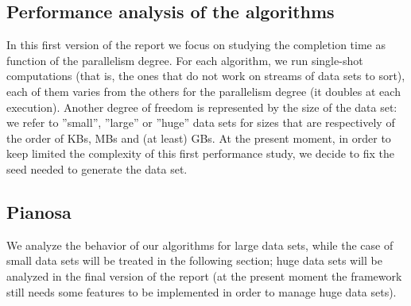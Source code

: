 \subsection{Performance analysis of the algorithms}
In this first version of the report we focus on studying the completion time as function of the parallelism degree. For each algorithm, we run single-shot computations (that is, the ones that do not work on streams of data sets to sort), each of them varies from the others for the parallelism degree (it doubles at each execution). Another degree of freedom is represented by the size of the data set: we refer to ''small'', ''large'' or ''huge'' data sets for sizes that are respectively of the order of KBs, MBs and (at least) GBs. At the present moment, in order to keep limited the complexity of this first performance study, we decide to fix the seed needed to generate the data set.

\subsection*{Pianosa}
We analyze the behavior of our algorithms for large data sets, while the case of small data sets will be treated in the following section; huge data sets will be analyzed in the final version of the report (at the present moment the framework still needs some features to be implemented in order to manage huge data sets).

